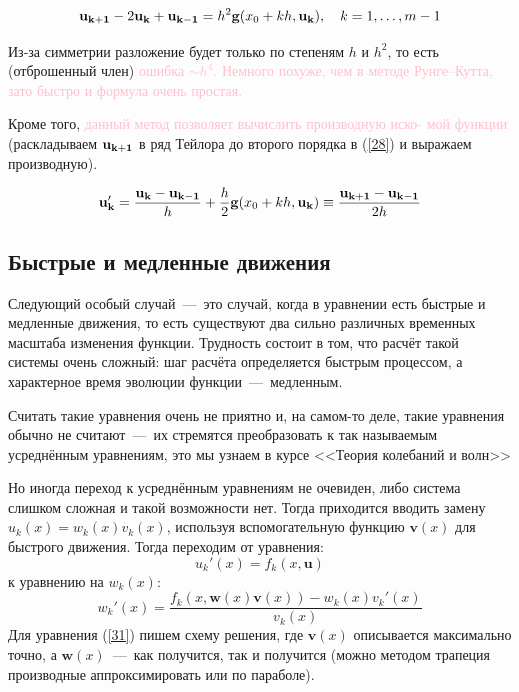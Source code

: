 \documentclass[a4,14pt,russian]{article}
\begin{document}
    \begin{equation}\label{28}
     {\bf u_{k+1}} - 2{\bf u_k} + {\bf u_{k-1}} = h^2{\bf g}(x_0 + kh, {\bf u_k}),\ \ \ k = 1, \ldots, m-1
    \end{equation}
    \par
    Из-за симметрии разложение будет только по степеням $h$ и $h^2$, то есть (отброшенный член) \textcolor{pink}{ошибка $\sim h^4$. Немного похуже, чем в методе} \textcolor{pink}{Рунге--Кутта, зато быстро и формула очень простая.}\par
    Кроме того, \textcolor{pink}{данный метод позволяет вычислить производную иско-} \textcolor{pink}{мой функции} (раскладываем ${\bf u_{k+1}}$ в ряд Тейлора до второго порядка в (\ref{28}) и выражаем производную).
    
    \begin{equation}
     {\bf u_{k}'} = \frac{{\bf u_k} - {\bf u_{k-1}}}h + \frac{h}2{\bf g}(x_0 + kh, {\bf u_k}) \equiv \frac{{\bf u_{k+1}} - {\bf u_{k-1}}}{2h}
     \end{equation}
    
\subsection{Быстрые и медленные движения}
    Следующий особый случай~---~это случай, когда в уравнении есть быстрые и медленные движения, то есть существуют два сильно различных временных масштаба изменения функции. Трудность состоит в том, что расчёт такой системы очень сложный: шаг расчёта определяется быстрым процессом, а характерное время эволюции функции~---~медленным.\par
    Считать такие уравнения очень не приятно и, на самом-то деле, такие уравнения обычно не считают~---~их стремятся преобразовать к так называемым усреднённым уравнениям, это мы узнаем в курсе <<Теория колебаний и волн>>\par
    Но иногда переход к усреднённым уравнениям не очевиден, либо система слишком сложная и такой возможности нет. Тогда приходится вводить замену $u_k(x)=w_k(x)v_k(x)$, используя вспомогательную функцию $\boldsymbol v(x)$ для быстрого движения. Тогда переходим от уравнения:
    \begin{equation}
     u_k'(x) = f_k(x, \boldsymbol u)
    \end{equation}
    к уравнению на $w_k(x)$:
    \begin{equation}\label{31}
     w_k'(x) = \frac{f_k(x, \boldsymbol w(x) \boldsymbol v(x)) - w_k(x)v_k'(x)}{v_k(x)}
    \end{equation}
    Для уравнения (\ref{31}) пишем схему решения, где  $\boldsymbol v(x)$ описывается максимально точно, а $\boldsymbol w(x)$~---~как получится, так и получится (можно методом трапеция производные аппроксимировать или по параболе).
\end{document}
